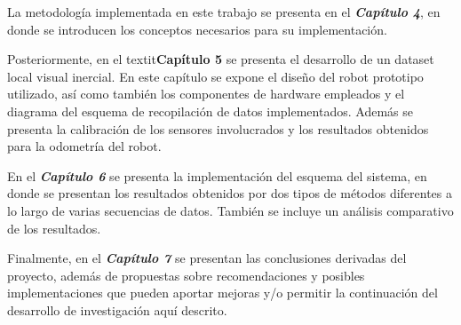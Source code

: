 La metodología implementada en este trabajo se presenta en el \textit{\textbf{Capítulo 4}}, en donde se introducen los conceptos necesarios para su implementación.

Posteriormente, en el textit{\textbf{Capítulo 5}} se presenta el desarrollo de un dataset local visual inercial. En este capítulo se expone el diseño del robot prototipo utilizado, así como también los componentes de hardware empleados y el diagrama del esquema de recopilación de datos implementados. Además se presenta la calibración de los sensores involucrados y los resultados obtenidos para la odometría del robot.

En el \textit{\textbf{Capítulo 6}} se presenta la implementación del esquema del sistema, en donde se presentan los resultados obtenidos por dos tipos de métodos diferentes a lo largo de varias secuencias de datos. También se incluye un análisis comparativo de los resultados.


Finalmente, en el \textit{\textbf{Capítulo 7}} se presentan las conclusiones derivadas del proyecto, además de propuestas sobre recomendaciones y posibles implementaciones que pueden aportar mejoras y/o permitir la continuación del desarrollo de investigación aquí descrito.
